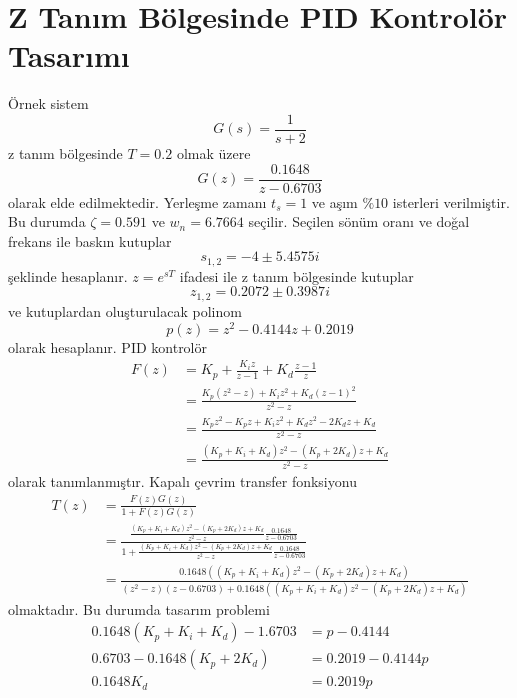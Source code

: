 \chapter{Z Tanım Bölgesinde PID Kontrolör Tasarımı}
Örnek sistem
\begin{equation}
    G(s)=\frac{1}{s+2}
\end{equation}
z tanım bölgesinde $T=0.2$ olmak üzere
\begin{equation}
    G(z)=\frac{0.1648}{z-0.6703}
\end{equation}
olarak elde edilmektedir. Yerleşme zamanı $t_s=1$ ve aşım $\%10$ isterleri verilmiştir. Bu durumda $\zeta=0.591$ ve $w_n=6.7664$ seçilir. Seçilen sönüm oranı ve doğal frekans ile baskın kutuplar
\begin{equation}
    s_{1,2}=-4 \pm 5.4575i
\end{equation}
şeklinde hesaplanır. $z=e^{sT}$ ifadesi ile z tanım bölgesinde kutuplar
\begin{equation}
    z_{1,2}=0.2072 \pm 0.3987i
\end{equation}
ve kutuplardan oluşturulacak polinom
\begin{equation}
    p(z)=z^2-0.4144 z+0.2019
\end{equation}
olarak hesaplanır. PID kontrolör
\begin{equation}
\begin{split}
    F(z)&=K_p+\frac{K_iz}{z-1}+K_d\frac{z-1}{z}\\
    &=\frac{K_p(z^2-z)+K_iz^2+K_d(z-1)^2}{z^2-z}\\
    &=\frac{K_pz^2-K_pz+K_iz^2+K_dz^2-2K_dz+K_d}{z^2-z}\\
    &=\frac{(K_p+K_i+K_d)z^2-(K_p+2K_d)z+K_d}{z^2-z}
\end{split}
\end{equation}
olarak tanımlanmıştır. Kapalı çevrim transfer fonksiyonu
\begin{equation}
    \begin{split}
        T(z)&=\frac{F(z)G(z)}{1+F(z)G(z)}\\
        &=\frac{\frac{(K_p+K_i+K_d)z^2-(K_p+2K_d)z+K_d}{z^2-z}\frac{0.1648}{z-0.6703}}{1+\frac{(K_p+K_i+K_d)z^2-(K_p+2K_d)z+K_d}{z^2-z}\frac{0.1648}{z-0.6703}}\\
        &=\frac{0.1648((K_p+K_i+K_d)z^2-(K_p+2K_d)z+K_d)}{(z^2-z)(z-0.6703)+0.1648((K_p+K_i+K_d)z^2-(K_p+2K_d)z+K_d)}
    \end{split}
\end{equation}
olmaktadır. Bu durumda tasarım problemi
\begin{equation}
    \begin{split}
        0.1648(K_p+K_i+K_d)-1.6703&= p- 0.4144\\
        0.6703-0.1648(K_p+2K_d)&=0.2019 - 0.4144p\\
        0.1648K_d&=0.2019p
    \end{split}
\end{equation}
